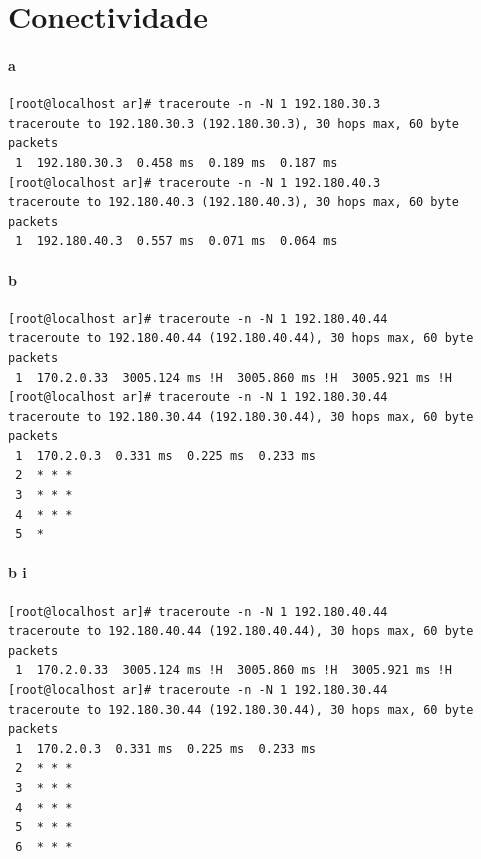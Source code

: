 \section{Conectividade}
\paragraph{a}
\begin{verbatim}
[root@localhost ar]# traceroute -n -N 1 192.180.30.3
traceroute to 192.180.30.3 (192.180.30.3), 30 hops max, 60 byte packets
 1  192.180.30.3  0.458 ms  0.189 ms  0.187 ms
[root@localhost ar]# traceroute -n -N 1 192.180.40.3
traceroute to 192.180.40.3 (192.180.40.3), 30 hops max, 60 byte packets
 1  192.180.40.3  0.557 ms  0.071 ms  0.064 ms
\end{verbatim}

\paragraph{b}
\begin{verbatim}
[root@localhost ar]# traceroute -n -N 1 192.180.40.44                    
traceroute to 192.180.40.44 (192.180.40.44), 30 hops max, 60 byte packets
 1  170.2.0.33  3005.124 ms !H  3005.860 ms !H  3005.921 ms !H           
[root@localhost ar]# traceroute -n -N 1 192.180.30.44                    
traceroute to 192.180.30.44 (192.180.30.44), 30 hops max, 60 byte packets
 1  170.2.0.3  0.331 ms  0.225 ms  0.233 ms                              
 2  * * *                                                                
 3  * * *                                                                
 4  * * *                                                                
 5  *                                                                    
\end{verbatim}

\paragraph{b i}
\begin{verbatim}
[root@localhost ar]# traceroute -n -N 1 192.180.40.44                     
traceroute to 192.180.40.44 (192.180.40.44), 30 hops max, 60 byte packets 
 1  170.2.0.33  3005.124 ms !H  3005.860 ms !H  3005.921 ms !H            
[root@localhost ar]# traceroute -n -N 1 192.180.30.44                     
traceroute to 192.180.30.44 (192.180.30.44), 30 hops max, 60 byte packets 
 1  170.2.0.3  0.331 ms  0.225 ms  0.233 ms                               
 2  * * *                                                                 
 3  * * *                                                                 
 4  * * *                                                                 
 5  * * *                                                                 
 6  * * *                                                                 
\end{verbatim}
